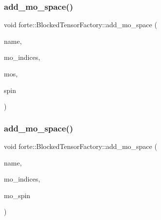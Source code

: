 \mbox{\label{classforte_1_1_blocked_tensor_factory_ab9bfd3f8d82a640bf816d841222396a8}} 
\subsubsection{\texorpdfstring{add\+\_\+mo\+\_\+space()}{add\_mo\_space()}\hspace{0.1cm}{\footnotesize\ttfamily [1/2]}}
{\footnotesize\ttfamily void forte\+::\+Blocked\+Tensor\+Factory\+::add\+\_\+mo\+\_\+space (\begin{DoxyParamCaption}\item[{const std\+::string \&}]{name,  }\item[{const std\+::string \&}]{mo\+\_\+indices,  }\item[{std\+::vector$<$ size\+\_\+t $>$}]{mos,  }\item[{ambit\+::\+Spin\+Type}]{spin }\end{DoxyParamCaption})}

\mbox{\label{classforte_1_1_blocked_tensor_factory_a774396c3920f7e306bef84e35b15eaf0}} 
\subsubsection{\texorpdfstring{add\+\_\+mo\+\_\+space()}{add\_mo\_space()}\hspace{0.1cm}{\footnotesize\ttfamily [2/2]}}
{\footnotesize\ttfamily void forte\+::\+Blocked\+Tensor\+Factory\+::add\+\_\+mo\+\_\+space (\begin{DoxyParamCaption}\item[{const std\+::string \&}]{name,  }\item[{const std\+::string \&}]{mo\+\_\+indices,  }\item[{std\+::vector$<$ std\+::pair$<$ size\+\_\+t, ambit\+::\+Spin\+Type $>$$>$}]{mo\+\_\+spin }\end{DoxyParamCaption})}

